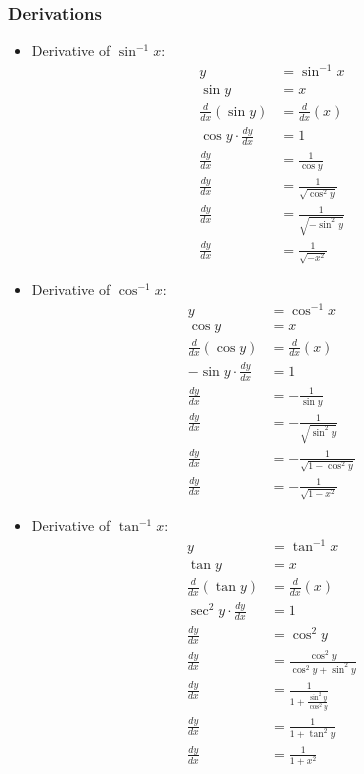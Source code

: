 \subsubsection{Derivations}
\begin{itemize}
	\item Derivative of $\sin^{-1} x$:
	\begin{align*}
		y &= \sin^{-1} x \\
		\sin y &= x \\
		\frac{d}{dx} (\sin y) &= \frac{d}{dx} (x) \\[5pt]
		\cos y \cdot \frac{dy}{dx} &= 1 \\[5pt]
		\frac{dy}{dx} &= \frac{1}{\cos y} \\[5pt]
		\frac{dy}{dx} &= \frac{1}{\sqrt{\cos^2 y}} \\[5pt]
		\frac{dy}{dx} &= \frac{1}{\sqrt{ - \sin^2 y}} \\[5pt]
		\frac{dy}{dx} &= \frac{1}{\sqrt{ - x^2}}
	\end{align*}

	\item Derivative of $\cos^{-1} x$:
	\begin{align*}
		y &= \cos^{-1} x \\
		\cos y &= x \\
		\frac{d}{dx} (\cos y) &= \frac{d}{dx} (x) \\[5pt]
		-\sin y \cdot \frac{dy}{dx} &= 1 \\[5pt]
		\frac{dy}{dx} &= -\frac{1}{\sin y} \\[5pt]
		\frac{dy}{dx} &= -\frac{1}{\sqrt{\sin^2 y}} \\[5pt]
		\frac{dy}{dx} &= -\frac{1}{\sqrt{1 - \cos^2 y}} \\[5pt]
		\frac{dy}{dx} &= -\frac{1}{\sqrt{1 - x^2}}
	\end{align*}

	\item Derivative of $\tan^{-1} x$:
	\begin{align*}
		y &= \tan^{-1} x \\
		\tan y &= x \\
		\frac{d}{dx} (\tan y) &= \frac{d}{dx} (x) \\[5pt]
		\sec^2 y \cdot \frac{dy}{dx} &= 1\\[5pt]
		\frac{dy}{dx} &= \cos^2 y \\[5pt]
		\frac{dy}{dx} &= \frac{\cos^2 y}{\cos^2 y + \sin^2 y} \\[5pt]
		\frac{dy}{dx} &= \frac{1}{1 + \frac{\sin^2 y}{\cos^2 y}} \\[5pt]
		\frac{dy}{dx} &= \frac{1}{1 + \tan^2 y} \\[5pt]
		\frac{dy}{dx} &= \frac{1}{1 + x^2}
	\end{align*}
\end{itemize}


